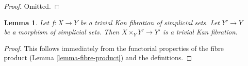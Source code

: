 \documentclass{stacks-project}
\theoremstyle{plain}
\newtheorem{lemma}[subsection]{Lemma}
\theoremstyle{definition}
\theoremstyle{remark}
\numberwithin{equation}{subsection}
\begin{document}
\begin{proof}
Omitted.
\end{proof}

\begin{lemma}
\label{lemma-trivial-kan-base-change}
Let $f : X \to Y$ be a trivial Kan fibration of simplicial sets.
Let $Y' \to Y$ be a morphism of simplicial sets.
Then $X \times_Y Y' \to Y'$ is a trivial Kan fibration.
\end{lemma}

\begin{proof}
This follows immediately from the functorial properties of the fibre
product (Lemma \ref{lemma-fibre-product}) and the definitions.
\end{proof}
\end{document}

